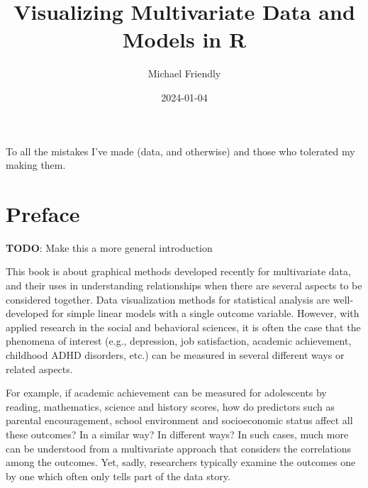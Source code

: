 \documentclass[
  letterpaper,
  10pt,
  krantz2]{krantz}
\title{Visualizing Multivariate Data and Models in R}
\author{Michael Friendly}
\date{2024-01-04}
\renewcommand*\contentsname{Table of contents}
\newcommand\contentsname{Table of contents}
\begin{document}
\maketitle

\thispagestyle{empty}

\begin{center}
To all the mistakes I've made (data, and otherwise) and those who tolerated my making them.
\end{center}

\setlength{\abovedisplayskip}{-5pt}
\setlength{\abovedisplayshortskip}{-5pt}

\ifdefined\Shaded\renewenvironment{Shaded}{\begin{tcolorbox}[interior hidden, sharp corners, boxrule=0pt, breakable, enhanced, borderline west={3pt}{0pt}{shadecolor}, frame hidden]}{\end{tcolorbox}}\fi

\renewcommand*\contentsname{Table of contents}
{
\hypersetup{linkcolor=}
\setcounter{tocdepth}{2}
\tableofcontents
}

\hypertarget{preface}{%
\chapter*{Preface}\label{preface}}


\textbf{TODO}: Make this a more general introduction

This book is about graphical methods developed recently for multivariate
data, and their uses in understanding relationships when there are
several aspects to be considered together. Data visualization methods
for statistical analysis are well-developed for simple linear models
with a single outcome variable. However, with applied research in the
social and behavioral sciences, it is often the case that the phenomena
of interest (e.g., depression, job satisfaction, academic achievement,
childhood ADHD disorders, etc.) can be measured in several different
ways or related aspects.

For example, if academic achievement can be measured for adolescents by
reading, mathematics, science and history scores, how do predictors such
as parental encouragement, school environment and socioeconomic status
affect all these outcomes? In a similar way? In different ways? In such
cases, much more can be understood from a multivariate approach that
considers the correlations among the outcomes. Yet, sadly, researchers
typically examine the outcomes one by one which often only tells part of
the data story.
\end{document}
